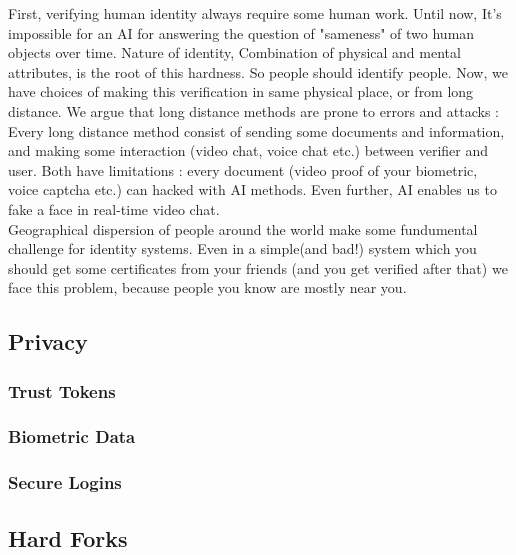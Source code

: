 \documentclass{article}
\begin{document}
First, verifying human identity always require some human work. Until now, It's impossible for an AI for answering the question of "sameness" of two human objects over time. Nature of identity, Combination of physical and mental attributes, is the root of this hardness. So people should identify people. Now, we have choices of making this verification in same physical place, or from long distance. We argue that long distance methods are prone to errors and attacks : Every long distance method consist of sending some documents and information, and making some interaction (video chat, voice chat etc.) between verifier and user. Both have limitations : every document (video proof of your biometric, voice captcha etc.) can hacked with AI methods. Even further, AI enables us to fake a face in real-time video chat.
\\
Geographical dispersion of people around the world make some fundumental challenge for identity systems. Even in a simple(and bad!) system which you should get some certificates from your friends (and you get verified after that) we face this problem, because people you know are mostly near you. 



\subsection{Privacy}
\subsubsection*{Trust Tokens}
\subsubsection*{Biometric Data}
\subsubsection*{Secure Logins}

\subsection{Hard Forks}
\end{document}
